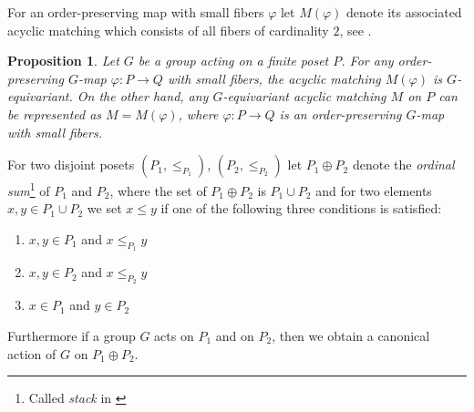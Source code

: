 \documentclass{elsarticle}
\newtheorem{prop}[df]{Proposition}
\begin{document}
For an order-preserving map with small fibers $\varphi$ let $M(\varphi)$ denote its associated acyclic matching which consists of all fibers of cardinality $2$, see \cite[Chapter 11]{buch}.
\begin{prop}
Let $G$ be a group acting on a finite poset $P$. For any order-preserving $G$-map $\varphi:P\longrightarrow Q$ with small fibers, the acyclic matching $M(\varphi)$ is $G$-equivariant. On the other hand, any $G$-equivariant acyclic matching $M$ on $P$ can be represented as $M=M(\varphi)$, where $\varphi:P\longrightarrow Q$ is an order-preserving $G$-map with small fibers.
\end{prop}
For two disjoint posets $(P_1,\leq_{P_1})$, $(P_2,\leq_{P_2})$ let $P_1\oplus P_2$ denote the \emph{ordinal sum}\footnote{Called \emph{stack} in \cite{buch}} of $P_1$ and $P_2$, where the set of $P_1\oplus P_2$ is $P_1\cup P_2$ and for two elements $x,y\in P_1\cup P_2$ we set $x\leq y$ if one of the following three conditions is satisfied:
\begin{enumerate}
\item $x,y\in P_1$ and $x\leq_{P_1} y$
\item $x,y\in P_2$ and $x\leq_{P_2} y$
\item $x\in P_1$ and $y\in P_2$
\end{enumerate}
Furthermore if a group $G$ acts on $P_1$ and on $P_2$, then we obtain a canonical action of $G$ on $P_1\oplus P_2$.
\end{document}
